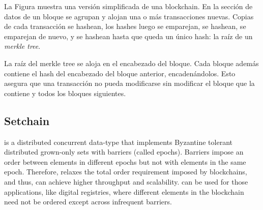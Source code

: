 La Figura muestra una versión simplificada de una blockchain. En la sección de datos de un bloque
se agrupan y alojan una o más transacciones nuevas. Copias de cada transacción se hashean, los hashes luego
se emparejan, se hashean, se emparejan de nuevo, y se hashean hasta que queda un único hash: la raíz de un
\textit{merkle tree}. 

La raíz del merkle tree se aloja en el encabezado del bloque. Cada bloque además contiene el hash del encabezado
del bloque anterior, encadenándolos. Esto asegura que una transacción no pueda modificarse sin modificar el bloque
que la contiene y todos los bloques siguientes.





\subsection{Setchain}
\setchain \cite{Capretto.2022.Setchain} is a distributed concurrent data-type
that implements Byzantine tolerant distributed grown-only sets with barriers
(called epochs).
%
Barriers impose an order between elements in different epochs but not with
elements in the same epoch.
%
Therefore, \setchain relaxes the total order requirement imposed by blockchains,
and thus, can achieve higher throughput and scalability.
%
\setchain can be used for those applications, like digital
registries, where different elements in the blockchain need not be
ordered except across infrequent barriers.


